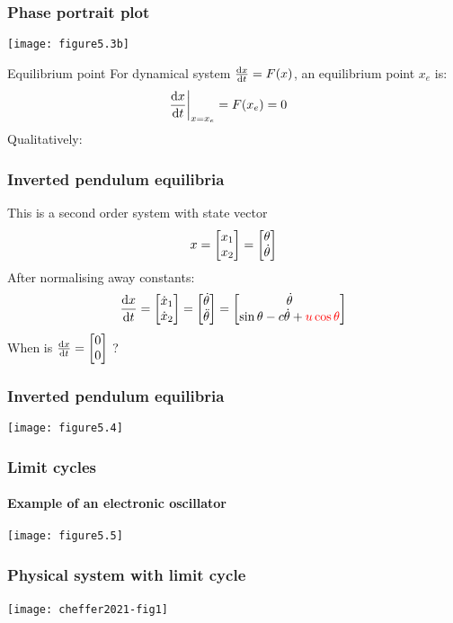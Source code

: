 \documentclass{beamer-control}
\begin{document}
\begin{frame}
\frametitle{Phase portrait plot}
\texttt{[image: figure5.3b]}

\end{frame}


\begin{frame}{Equilibrium point}
For dynamical system $\frac{\mathrm{d} x}{\mathrm{d} t} = F(x)$, an equilibrium point $x_e$ is:
\begin{align}
\left.\frac{\mathrm{d} x}{\mathrm{d} t}\right|_{x=x_e} &= F(x_e) = 0
\end{align}
Qualitatively:
\vspace{3cm}
\end{frame}

\begin{frame}
\frametitle{Inverted pendulum equilibria}
This is a second order system with state vector
\begin{gather}
x = \begin{bmatrix}x_1\\x_2\end{bmatrix} = \begin{bmatrix}\theta\\\dot\theta\end{bmatrix}
\end{gather}
After normalising away constants:
\begin{gather}
\frac{\mathrm{d} x}{\mathrm{d} t} = \begin{bmatrix}\dot x_1\\\dot x_2\end{bmatrix} = \begin{bmatrix}\dot\theta\\\ddot\theta\end{bmatrix} = \begin{bmatrix}\dot\theta\\\sin\theta-c\dot\theta+{\color{red}u\cos\theta}\end{bmatrix}
\end{gather}
When is $\frac{\mathrm{d} x}{\mathrm{d} t} = \begin{bmatrix}0\\0\end{bmatrix}$ ?

\end{frame}

\begin{frame}
\frametitle{Inverted pendulum equilibria}
\texttt{[image: figure5.4]}

\end{frame}

\begin{frame}
\frametitle{Limit cycles}
\framesubtitle{Example of an electronic oscillator}
\texttt{[image: figure5.5]}

\end{frame}

\begin{frame}
\frametitle{Physical system with limit cycle}
\framesubtitle{}

\texttt{[image: cheffer2021-fig1]}

\end{frame}
\end{document}
